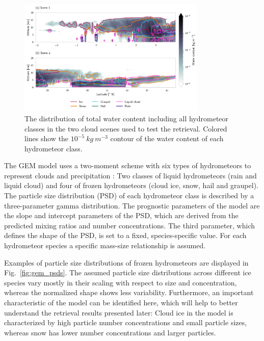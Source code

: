 \documentclass[journal abbreviation, manuscript]{copernicus}
\begin{document}
\begin{figure}[h!]
\centering
\includegraphics[width = 0.8\textwidth]{../plots/scene_overview.png}
\caption{The distribution of total water content including all hydrometeor
  classes in the two cloud scenes used to test the retrieval. Colored lines show the
  $10^{-5}\ \unit{kg\ m^{-3}}$ contour of the water content of each hydrometeor class.}
\label{fig:overview}
\end{figure}

The GEM model uses a two-moment scheme with six types of hydrometeors to
represent clouds and precipitation \citep{milbrandtyau05}: Two classes of liquid
hydrometeors (rain and liquid cloud) and four of frozen hydrometeors (cloud ice,
snow, hail and graupel). The particle size distribution (PSD) of each
hydrometeor class is described by a three-parameter gamma distribution. The
prognostic parameters of the model are the slope and intercept parameters of the
PSD, which are derived from the predicted mixing ratios and number
concentrations. The third parameter, which defines the shape of the PSD, is set
to a fixed, species-specific value. For each hydrometeor species a specific
mass-size relationship is assumed.

Examples of particle size distributions of frozen hydrometeors are displayed in
Fig.~\ref{fig:gem_psds}. The assumed particle size distributions across
different ice species vary mostly in their scaling with respect to size and
concentration, whereas the normalized shape shows less variability. Furthermore,
an important characteristic of the model can be identified here, which will help
to better understand the retrieval results presented later: Cloud ice in the
model is characterized by high particle number concentrations and small particle
sizes, whereas snow has lower number concentrations and larger particles.
\end{document}
